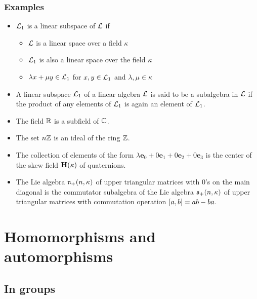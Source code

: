 \subsubsection{Examples}
\begin{itemize}
	\item $\mathcal{L}_1$ is a linear subspace of $\mathcal{L}$ if
	\begin{itemize}
		\item $\mathcal{L}$ is a linear space over a field $\kappa$
		\item $\mathcal{L}_1$ is also a linear space over the field $\kappa$
		\item $\lambda x+\mu y\in \mathcal{L}_1$ for $x,y\in \mathcal{L}_1$ and $\lambda,\mu\in\kappa$
	\end{itemize}
	\item A linear subspace $\mathcal{L}_1$ of a linear algebra $\mathcal{L}$ is said to be a subalgebra in $\mathcal{L}$ if the product of any elements of $\mathcal{L}_1$ is again an element of $\mathcal{L}_1$.
	\item The field $\mathbb{R}$ is a subfield of $\mathbb{C}$.
	\item The set $n\mathbb{Z}$ is an ideal of the ring $\mathbb{Z}$.
	\item The collection of elements of the form $\lambda \bm{e}_0+0\bm{e}_1+0\bm{e}_2+0\bm{e}_3$ is the
	center of the skew field $\mathbf{H}(\kappa)$ of quaternions. 
	\item The Lie algebra $\mathfrak{n}_+(n, \kappa)$ of upper triangular matrices with $0$'s on the main diagonal is the commutator subalgebra of the Lie algebra $\mathfrak{s}_+(n, \kappa)$ of upper triangular matrices with commutation operation $\comm{a}{b}=ab-ba$.
\end{itemize}

\section{Homomorphisms and automorphisms}
\subsection{In groups}
